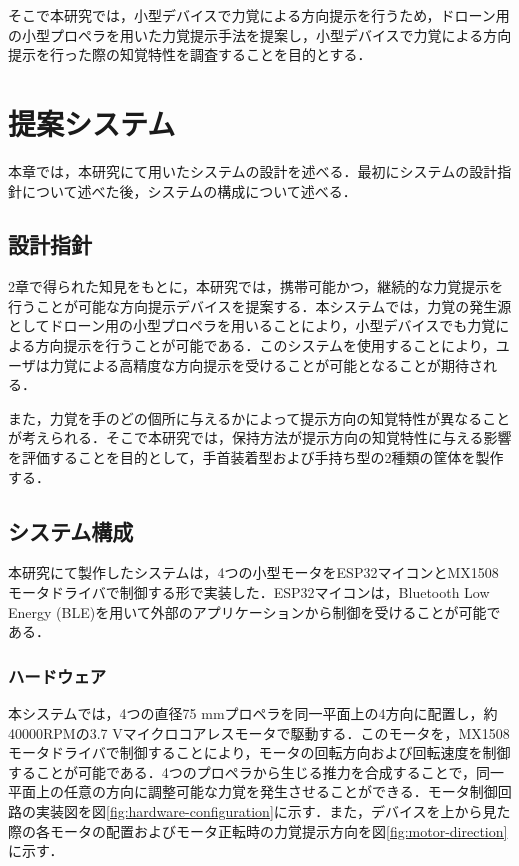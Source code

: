 \documentclass[a4paper,11pt]{jreport}
\begin{document}
そこで本研究では，小型デバイスで力覚による方向提示を行うため，ドローン用の小型プロペラを用いた力覚提示手法を提案し，小型デバイスで力覚による方向提示を行った際の知覚特性を調査することを目的とする．

\chapter{提案システム}
本章では，本研究にて用いたシステムの設計を述べる．最初にシステムの設計指針について述べた後，システムの構成について述べる．

\section{設計指針}
2章で得られた知見をもとに，本研究では，携帯可能かつ，継続的な力覚提示を行うことが可能な方向提示デバイスを提案する．本システムでは，力覚の発生源としてドローン用の小型プロペラを用いることにより，小型デバイスでも力覚による方向提示を行うことが可能である．このシステムを使用することにより，ユーザは力覚による高精度な方向提示を受けることが可能となることが期待される．

また，力覚を手のどの個所に与えるかによって提示方向の知覚特性が異なることが考えられる．そこで本研究では，保持方法が提示方向の知覚特性に与える影響を評価することを目的として，手首装着型および手持ち型の2種類の筐体を製作する．

\section{システム構成}
本研究にて製作したシステムは，4つの小型モータをESP32マイコン\cite{esp_wroom_32_datasheet}とMX1508モータドライバ\cite{mtr_09_017_datasheet}で制御する形で実装した．ESP32マイコンは，Bluetooth Low Energy (BLE)\cite{bluetooth_tech_overview}を用いて外部のアプリケーションから制御を受けることが可能である．

\subsection{ハードウェア}
本システムでは，4つの直径75 mmプロペラを同一平面上の4方向に配置し，約40000RPMの3.7 Vマイクロコアレスモータで駆動する．このモータを，MX1508モータドライバで制御することにより，モータの回転方向および回転速度を制御することが可能である．4つのプロペラから生じる推力を合成することで，同一平面上の任意の方向に調整可能な力覚を発生させることができる．モータ制御回路の実装図を図\ref{fig:hardware-configuration}に示す．また，デバイスを上から見た際の各モータの配置およびモータ正転時の力覚提示方向を図\ref{fig:motor-direction}に示す．
\end{document}
